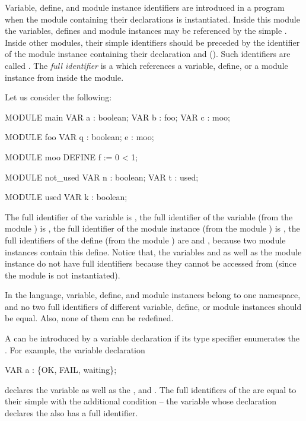 Variable, define, and module instance identifiers are introduced in a
program when the module containing their declarations is
instantiated. 
%
Inside this module the variables, defines and module instances may be
referenced by the simple .
%
Inside other modules, their simple identifiers should be preceded by
the identifier of the module instance containing their declaration and
 ().
%
Such identifiers are called .
%
The \emph{full identifier} is a  which
references a variable, define, or a module instance from inside the
 module. 

Let us consider the following:
%
\begin{nusmvCode}
MODULE main
  VAR a : boolean;
  VAR b : foo;
  VAR c : moo;

MODULE foo
  VAR q : boolean;
      e : moo;

MODULE moo
  DEFINE f := 0 < 1;

MODULE not_used
  VAR n : boolean;
  VAR t : used;

MODULE used
  VAR k : boolean;
\end{nusmvCode}
%
The full identifier of the variable  is , the full
identifier of the variable  (from the module ) is
, the full identifier of the module instance  (from
the module ) is , the full identifiers of the
define  (from the module ) are  and
, because two module instances contain this define.
%
Notice that, the variables  and  as well as the module
instance  do not have full identifiers because they cannot be
accessed from  (since the module  is not
instantiated).

In the \nusmv language, variable, define, and module instances belong
to one namespace, and no two full identifiers of different variable,
define, or module instances should be equal. Also, none of them can be
redefined.

A  can be introduced by a variable
declaration if its type specifier enumerates the . For example, the variable declaration
%
\begin{nusmvCode}
  VAR a : \{OK, FAIL, waiting\};
\end{nusmvCode}
%
declares the variable  as well as the  ,  and . 
%
The full identifiers of the  are equal to
their simple  with the additional condition --
the variable whose declaration declares the  also has a full identifier.

